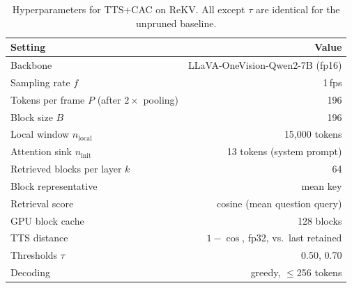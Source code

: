 \begin{table}[t]
  \centering
  \small
  \begin{tabular}{@{}lr@{}}
    \toprule
    Setting & Value \\
    \midrule
    Backbone & LLaVA-OneVision-Qwen2-7B (fp16) \\
    Sampling rate $f$ & 1\,fps \\
    Tokens per frame $P$ (after $2{\times}$ pooling) & 196 \\
    Block size $B$ & 196 \\
    Local window $n_{\text{local}}$ & 15{,}000 tokens \\
    Attention sink $n_{\text{init}}$ & 13 tokens (system prompt) \\
    Retrieved blocks per layer $k$ & 64 \\
    Block representative & mean key \\
    Retrieval score & cosine (mean question query) \\
    GPU block cache & 128 blocks \\
    TTS distance & $1-\cos$, fp32, vs.\ last retained \\
    Thresholds $\tau$ & 0.50, 0.70 \\
    Decoding & greedy, $\le$256 tokens \\
    \bottomrule
  \end{tabular}
  \caption{Hyperparameters for TTS+CAC on ReKV. All except $\tau$ are identical for the
  unpruned baseline.}
  \label{tab:supp_hparams}
\end{table}
